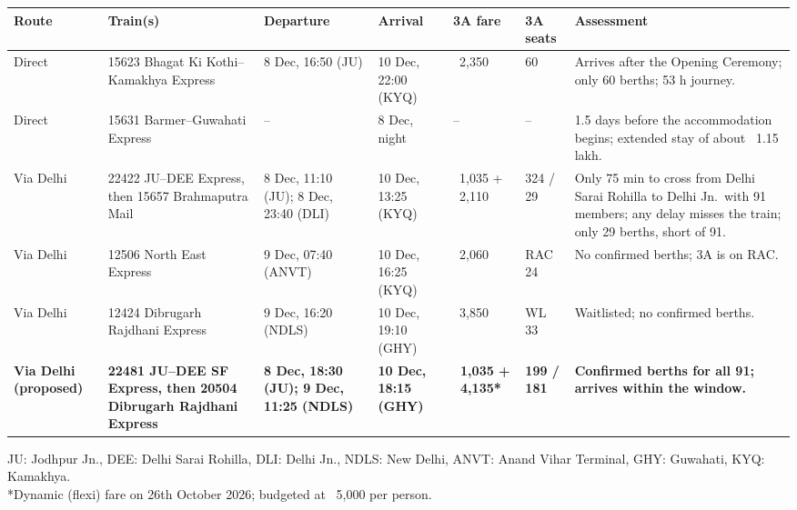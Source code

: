 \documentclass[11pt,letterpaper]{article}
\newcommand{\rs}{{\rupee}}
\begin{document}
{\small\setlength{\tabcolsep}{4pt}
\begin{longtable}{|L{1.9cm}|L{2.9cm}|L{2.1cm}|L{2.0cm}|R{1.5cm}|C{1.2cm}|L{2.8cm}|}
\hline
\textbf{Route} & \textbf{Train(s)} & \textbf{Departure} & \textbf{Arrival} & \textbf{3A fare} & \textbf{3A seats} & \textbf{Assessment} \\ \hline
\endhead
Direct & 15623 Bhagat Ki Kothi--Kamakhya Express & 8 Dec, 16:50 (JU) & 10 Dec, 22:00 (KYQ) & \rs~2,350 & 60 & Arrives after the Opening Ceremony; only 60 berths; 53 h journey. \\ \hline
Direct & 15631 Barmer--Guwahati Express & -- & 8 Dec, night & -- & -- & 1.5 days before the accommodation begins; extended stay of about \rs~1.15 lakh. \\ \hline
Via Delhi & 22422 JU--DEE Express, then 15657 Brahmaputra Mail & 8 Dec, 11:10 (JU); 8 Dec, 23:40 (DLI) & 10 Dec, 13:25 (KYQ) & \rs~1,035 + \rs~2,110 & 324 / 29 & Only 75 min to cross from Delhi Sarai Rohilla to Delhi Jn.\ with 91 members; any delay misses the train; only 29 berths, short of 91. \\ \hline
Via Delhi & 12506 North East Express & 9 Dec, 07:40 (ANVT) & 10 Dec, 16:25 (KYQ) & \rs~2,060 & RAC 24 & No confirmed berths; 3A is on RAC. \\ \hline
Via Delhi & 12424 Dibrugarh Rajdhani Express & 9 Dec, 16:20 (NDLS) & 10 Dec, 19:10 (GHY) & \rs~3,850 & WL 33 & Waitlisted; no confirmed berths. \\ \hline
\textbf{Via Delhi (proposed)} & \textbf{22481 JU--DEE SF Express, then 20504 Dibrugarh Rajdhani Express} & \textbf{8 Dec, 18:30 (JU); 9 Dec, 11:25 (NDLS)} & \textbf{10 Dec, 18:15 (GHY)} & \textbf{\rs~1,035 + \rs~4,135*} & \textbf{199 / 181} & \textbf{Confirmed berths for all 91; arrives within the window.} \\ \hline
\end{longtable}}

{\small JU: Jodhpur Jn., DEE: Delhi Sarai Rohilla, DLI: Delhi Jn., NDLS: New Delhi, ANVT: Anand Vihar Terminal, GHY: Guwahati, KYQ: Kamakhya.\\
*Dynamic (flexi) fare on 26th October 2026; budgeted at \rs~5,000 per person.}
\end{document}
